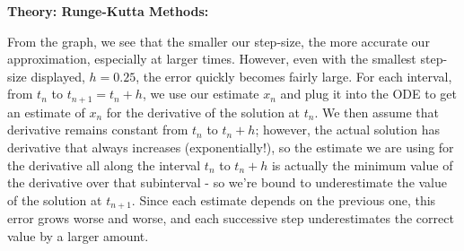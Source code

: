 \documentclass{article}
\begin{document}
\begin{center}
\end{center}








\clearpage










\textbf{Theory: Runge-Kutta Methods:}

\bigskip


From the graph, we see that the smaller our step-size, the more accurate our approximation, especially at larger times. However, even with the smallest step-size displayed, $h=0.25$, the error quickly becomes fairly large. For each interval, from $t_n$ to $t_{n+1}=t_n+h$, we use our estimate $x_n$ and plug it into the ODE to get an estimate of $x_n$ for the derivative of the solution at $t_n$. We then assume that derivative remains constant from $t_n$ to $t_n+h$; however, the actual solution has derivative that always increases (exponentially!), so the estimate we are using for the derivative all along the interval $t_n$ to $t_n+h$ is actually the minimum value of the derivative over that subinterval - so we're bound to underestimate the value of the solution at $t_{n+1}$. Since each estimate depends on the previous one, this error grows worse and worse, and each successive step underestimates the correct value by a larger amount.
\end{document}
